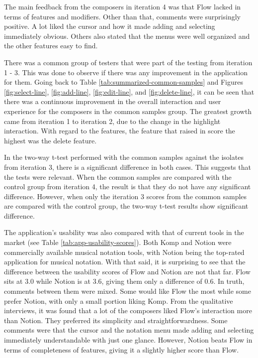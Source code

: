 		The main feedback from the composers in iteration 4 was that Flow lacked in terms of features and modifiers. Other than that, comments were surprisingly positive. A lot liked the cursor and how it made adding and selecting immediately obvious. Others also stated that the menus were well organized and the other features easy to find. 

		There was a common group of testers that were part of the testing from iteration 1 - 3. This was done to observe if there was any improvement in the application for them. Going back to Table \ref{tab:summarized-common-samples} and Figures \ref{fig:select-line}, \ref{fig:add-line}, \ref{fig:edit-line}, and \ref{fig:delete-line}, it can be seen that there was a continuous improvement in the overall interaction and user experience for the composers in the common samples group. The greatest growth came from iteration 1 to iteration 2, due to the change in the highlight interaction. With regard to the features, the feature that raised in score the highest was the delete feature. 

		In the two-way t-test performed with the common samples against the isolates from iteration 3, there is a significant difference in both cases. This suggests that the tests were relevant. When the common samples are compared with the control group from iteration 4, the result is that they do not have any significant difference. However, when only the iteration 3 scores from the common samples are compared with the control group, the two-way t-test results show significant difference. 

		The application's usability was also compared with that of current tools in the market (see Table \ref{tab:app-usability-scores}). Both Komp and Notion were commercially available musical notation tools, with Notion being the top-rated application for musical notation. With that said, it is surprising to see that the difference between the usability scores of Flow and Notion are not that far. Flow sits at 3.0 while Notion is at 3.6, giving them only a difference of 0.6. In truth, comments between them were mixed. Some would like Flow the most while some prefer Notion, with only a small portion liking Komp. From the qualitative interviews, it was found that a lot of the composers liked Flow's interaction more than Notion. They preferred its simplicity and straightforwardness. Some comments were that the cursor and the notation menu made adding and selecting immediately understandable with just one glance. However, Notion beats Flow in terms of completeness of features, giving it a slightly higher score than Flow. 
		
